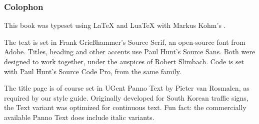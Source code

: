 \documentclass[main]{subfiles}
\begin{document}
\vspace*{\fill}

\begin{small}
    \subsubsection*{Colophon}

    This book was typeset using {\LaTeX} and {Lua\TeX} with Markus Kohm's {\KOMAScript}.

    The text is set in Frank Grießhammer's Source Serif, an open-source font from Adobe.
    Titles, heading and other accents use Paul Hunt's {\sffamily Source Sans}.
    Both were designed to work together, under the auspices of Robert Slimbach.
    Code is set with Paul Hunt's {\ttfamily Source Code Pro}, from the same family.

    The title page is of course set in {\panno\selectfont UGent Panno Text} by Pieter van Rosmalen, as required by our style guide.
    Originally developed for South Korean traffic signs, the Text variant was optimized for continuous text.
    Fun fact: the commercially available Panno Text does include italic variants.
\end{small}
\end{document}
